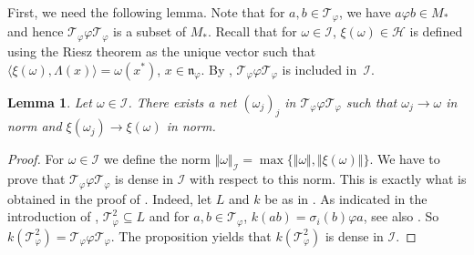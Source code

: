 \documentclass[11pt]{article}
\numberwithin{equation}{section}
\newtheorem{lem}[thm]{Lemma}
\theoremstyle{definition}
\newcommand{\cHil}{\mathcal{H}}
\newcommand{\nphi}{\mathfrak{n}_\varphi}
\begin{document}
First, we need the following lemma. Note that for $a, b \in \mathcal{T}_\varphi$, we have $a \varphi b \in M_\ast$ and hence $\mathcal{T}_{\varphi} \varphi \mathcal{T}_{\varphi}$ is a subset of $M_\ast$. Recall that for $\omega \in \mathcal{I}$, $\xi(\omega) \in \cHil$ is def\/ined using the Riesz theorem as the unique vector such that $\langle  \xi(\omega) , \Lambda(x)\rangle = \omega(x^\ast)$, $x \in \nphi$. By \cite[Lemma~8.5]{KusVae}, $\mathcal{T}_\varphi \varphi \mathcal{T}_\varphi$ is included in~$\mathcal{I}$.

\begin{lem}\label{LemTechLem}
Let $\omega \in \mathcal{I}$. There exists a net $(\omega_j)_j$ in $\mathcal{T}_{\varphi} \varphi \mathcal{T}_{\varphi}$ such that $\omega_j \rightarrow \omega$ in norm and $\xi(\omega_j) \rightarrow \xi(\omega)$ in norm.
\end{lem}

\begin{proof}
 For $\omega \in \mathcal{I}$ we def\/ine the norm $\Vert \omega \Vert_{\mathcal{I}} = \max \{ \Vert \omega \Vert, \Vert \xi(\omega) \Vert \}$. We have to prove that $\mathcal{T}_{\varphi} \varphi \mathcal{T}_{\varphi}$ is dense in $\mathcal{I}$ with respect to this norm. This is exactly what is obtained in the proof of  \cite[Proposition 3.4]{Cas}. Indeed, let $ L$ and $k$ be as in \cite{Cas}. As indicated in the introduction of \cite{Cas},  $\mathcal{T}_{\varphi}^2 \subseteq L$ and for $a,b \in \mathcal{T}_{\varphi}$, $k(ab) = \sigma_i(b) \varphi a$, see also \cite[Corollary 2.15]{Cas}. So $k(\mathcal{T}_{\varphi}^2 ) = \mathcal{T}_{\varphi} \varphi \mathcal{T}_{\varphi}$. The proposition yields that $k(\mathcal{T}_{\varphi}^2 )$ is dense in $\mathcal{I}$.
\end{proof}
\end{document}
